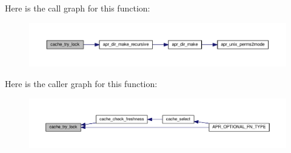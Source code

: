 Here is the call graph for this function\+:
\nopagebreak
\begin{figure}[H]
\begin{center}
\leavevmode
\includegraphics[width=350pt]{group__Cache__util_gaffa94dfea5098ffab89d1dc91e094415_cgraph}
\end{center}
\end{figure}




Here is the caller graph for this function\+:
\nopagebreak
\begin{figure}[H]
\begin{center}
\leavevmode
\includegraphics[width=350pt]{group__Cache__util_gaffa94dfea5098ffab89d1dc91e094415_icgraph}
\end{center}
\end{figure}


